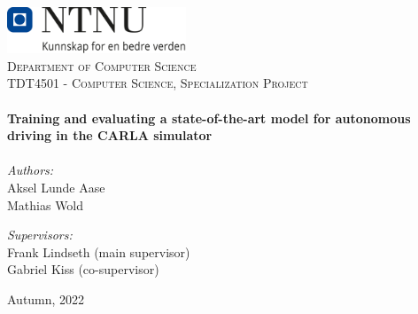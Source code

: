 \begin{titlepage}
\vbox{ }

\vbox{ }

\begin{center}
\includegraphics[width=0.40\textwidth]{figures/NTNU_logo.png}\\[1cm]
\textsc{\LARGE Department of Computer Science}\\[1.5cm]
\textsc{\Large TDT4501 - Computer Science, Specialization Project}\\[0.5cm]


\vbox{ }
\HRule \\[0.4cm]
{ \huge \bfseries Training and evaluating a state-of-the-art model for autonomous driving in the CARLA simulator}\\[0.2cm]
\HRule \\[1.5cm]

\large
\emph{Authors:}\\
Aksel Lunde Aase \\
Mathias Wold

\vbox{ }

\vbox{ }

\emph{Supervisors:}\\
Frank Lindseth (main supervisor) \\
Gabriel Kiss (co-supervisor)


\vfill
{\large Autumn, 2022}
\end{center}
\end{titlepage}
